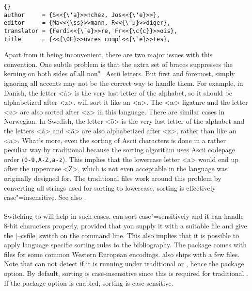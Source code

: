 \documentclass{ltxdockit}[2011/03/25]
\begin{document}
\begin{lstlisting}[style=bibtex,upquote]{}
author     = {S<<{\'a}>>nchez, Jos<<{\'e}>>},
editor     = {Ma<<{\ss}>>mann, R<<{\"u}>>diger},
translator = {Ferdi<<{\`e}>>re, Fr<<{\c{c}}>>ois},
title      = {<<{\OE}>>uvres compl<<{\`e}>>tes},
\end{lstlisting}
%
Apart from it being inconvenient, there are two major issues with this convention. One subtle problem is that the extra set of braces suppresses the kerning on both sides of all non"=Ascii letters. But first and foremost, simply ignoring all accents may not be the correct way to handle them. For example, in Danish, the letter <å> is the very last letter of the alphabet, so it should be alphabetized after <z>. \bibtex will sort it like an <a>. The <æ> ligature and the letter <ø> are also sorted after <z> in this language. There are similar cases in Norwegian. In Swedish, the letter <ö> is the very last letter of the alphabet and the letters <å> and <ä> are also alphabetized after <z>, rather than like an <a>. What's more, even the sorting of Ascii characters is done in a rather peculiar way by traditional \bibtex because the sorting algorithm uses Ascii codepage order (\texttt{0-9,A-Z,a-z}). This implies that the lowercase letter <a> would end up after the uppercase <Z>, which is not even acceptable in the language \bibtex was originally designed for. The traditional  files work around this problem by converting all strings used for sorting to lowercase, \ie sorting is effectively case"=insensitive. See also .

\paragraph{}
\label{bib:cav:enc:bt8}
Switching to  will help in such cases.  can sort case"=sensitively and it can handle 8-bit characters properly, provided that you supply it with a suitable  file and give the |--csfile| switch on the command line. This also implies that it is possible to apply language specific sorting rules to the bibliography. The  package comes with  files for some common Western European encodings.  also ships with a few  files. Note that  can not detect if it is running under traditional \bibtex or , hence the  package option. By default, sorting is case-insensitive since this is required for traditional \bibtex. If the  package option is enabled, sorting is case-sensitive.
\end{document}
